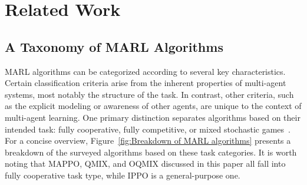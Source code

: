 \section{Related Work}\label{sec:related}
\subsection{A Taxonomy of MARL Algorithms}
MARL algorithms can be categorized according to several key characteristics.
Certain classification criteria arise from the inherent properties of multi-agent systems, most notably the structure of the task. In contrast, other criteria, such as the explicit modeling or awareness of other agents, are unique to the context of multi-agent learning. 
One primary distinction separates algorithms based on their intended task: fully cooperative, fully competitive, or mixed stochastic games~\cite{busoniuComprehensiveSurveyMultiagent2008a}.
For a concise overview, Figure~\ref{fig:Breakdown of MARL algorithms} presents a breakdown of the surveyed algorithms based on these task categories.
It is worth noting that MAPPO, QMIX, and OQMIX discussed in this paper all fall into fully cooperative task type, while IPPO is a general-purpose one.
